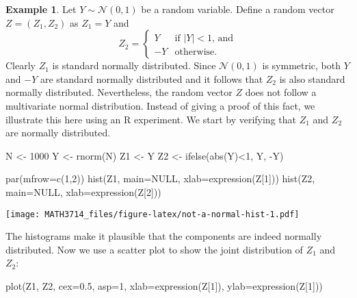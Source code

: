 \documentclass[
  a4paper,
]{article}
\newenvironment{Shaded}{\begin{snugshade}}{\end{snugshade}}
\newcommand{\AttributeTok}[1]{\textcolor[rgb]{0.77,0.63,0.00}{#1}}
\newcommand{\ConstantTok}[1]{\textcolor[rgb]{0.00,0.00,0.00}{#1}}
\newcommand{\DecValTok}[1]{\textcolor[rgb]{0.00,0.00,0.81}{#1}}
\newcommand{\FloatTok}[1]{\textcolor[rgb]{0.00,0.00,0.81}{#1}}
\newcommand{\FunctionTok}[1]{\textcolor[rgb]{0.00,0.00,0.00}{#1}}
\newcommand{\NormalTok}[1]{#1}
\newcommand{\OtherTok}[1]{\textcolor[rgb]{0.56,0.35,0.01}{#1}}
\newcommand{\SpecialCharTok}[1]{\textcolor[rgb]{0.00,0.00,0.00}{#1}}
\theoremstyle{definition}
\theoremstyle{definition}
\newtheorem{example}{Example}[section]
\theoremstyle{definition}
\theoremstyle{definition}
\theoremstyle{remark}
\begin{document}
\begin{example}
\protect\hypertarget{exm:not-normal}{}\label{exm:not-normal}Let \(Y \sim \mathcal{N}(0, 1)\) be a random variable. Define a random vector
\(Z = (Z_1, Z_2)\) as \(Z_1 = Y\) and
\begin{equation*}
  Z_2 = \begin{cases}
    Y & \mbox{if $|Y|<1$, and}\\
    -Y & \mbox{otherwise.}
  \end{cases}
\end{equation*}
Clearly \(Z_1\) is standard normally distributed.
Since \(\mathcal{N}(0,1)\) is symmetric, both \(Y\) and \(-Y\) are standard normally
distributed and it follows that \(Z_2\) is also standard normally distributed.
Nevertheless, the random vector \(Z\) does not follow a multivariate
normal distribution. Instead of giving a proof of this fact,
we illustrate this here using an R experiment. We start by verifying
that \(Z_1\) and \(Z_2\) are normally distributed.

\begin{Shaded}
\begin{Highlighting}[]
\NormalTok{N }\OtherTok{\textless{}{-}} \DecValTok{1000}
\NormalTok{Y }\OtherTok{\textless{}{-}} \FunctionTok{rnorm}\NormalTok{(N)}
\NormalTok{Z1 }\OtherTok{\textless{}{-}}\NormalTok{ Y}
\NormalTok{Z2 }\OtherTok{\textless{}{-}} \FunctionTok{ifelse}\NormalTok{(}\FunctionTok{abs}\NormalTok{(Y)}\SpecialCharTok{\textless{}}\DecValTok{1}\NormalTok{, Y, }\SpecialCharTok{{-}}\NormalTok{Y)}

\FunctionTok{par}\NormalTok{(}\AttributeTok{mfrow=}\FunctionTok{c}\NormalTok{(}\DecValTok{1}\NormalTok{,}\DecValTok{2}\NormalTok{))}
\FunctionTok{hist}\NormalTok{(Z1, }\AttributeTok{main=}\ConstantTok{NULL}\NormalTok{, }\AttributeTok{xlab=}\FunctionTok{expression}\NormalTok{(Z[}\DecValTok{1}\NormalTok{]))}
\FunctionTok{hist}\NormalTok{(Z2, }\AttributeTok{main=}\ConstantTok{NULL}\NormalTok{, }\AttributeTok{xlab=}\FunctionTok{expression}\NormalTok{(Z[}\DecValTok{2}\NormalTok{]))}
\end{Highlighting}
\end{Shaded}

\texttt{[image: MATH3714\_files/figure-latex/not-a-normal-hist-1.pdf]}

The histograms make it plausible that the components are indeed normally
distributed. Now we use a scatter plot to show the joint distribution
of \(Z_1\) and~\(Z_2\):

\begin{Shaded}
\begin{Highlighting}[]
\FunctionTok{plot}\NormalTok{(Z1, Z2, }\AttributeTok{cex=}\FloatTok{0.5}\NormalTok{, }\AttributeTok{asp=}\DecValTok{1}\NormalTok{,}
     \AttributeTok{xlab=}\FunctionTok{expression}\NormalTok{(Z[}\DecValTok{1}\NormalTok{]),}
     \AttributeTok{ylab=}\FunctionTok{expression}\NormalTok{(Z[}\DecValTok{1}\NormalTok{]))}
\end{Highlighting}
\end{Shaded}


\end{example}
\end{document}
